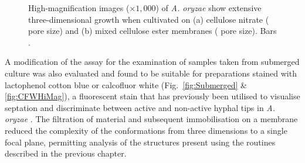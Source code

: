 \begin{figure}[htbp]
	\centering
	\hspace{0.5cm}
	\caption{High-magnification images ($\times 1,000$) of \emph{A. oryzae} show extensive three-dimensional growth when cultivated on (a) cellulose nitrate ( pore size) and (b) mixed cellulose ester membranes ( pore size). Bars .}
	\label{fig:MembranesHiMag}
\end{figure}

A modification of the assay for the examination of samples taken from submerged culture was also evaluated and found to be suitable for preparations stained with lactophenol cotton blue or calcofluor white (Fig.~\ref{fig:Submerged} \& \ref{fig:CFWHiMag}), a fluorescent stain that has previously been utilised to visualise septation and discriminate between active and non-active hyphal tips in \emph{A. oryzae} \cite{amanullah2002}. The filtration of material and subsequent immobilisation on a membrane reduced the complexity of the conformations from three dimensions to a single focal plane, permitting analysis of the structures present using the routines described in the previous chapter.

